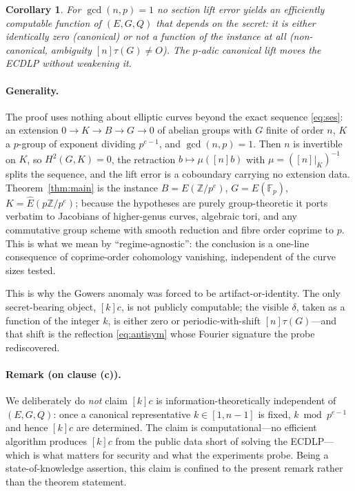 \documentclass[11pt]{article}
\newtheorem{corollary}{Corollary}
\theoremstyle{definition}
\newcommand{\Fp}{\mathbb{F}_p}
\newcommand{\Z}{\mathbb{Z}}
\newcommand{\Ehat}{\widehat{E}}
\begin{document}
\begin{corollary}\label{cor:main}
For $\gcd(n,p)=1$ no section lift error yields an efficiently computable
function of $(E,G,Q)$ that depends on the secret: it is either
identically zero (canonical) or not a function of the instance at all
(non-canonical, ambiguity $[n]\tau(G)\neq O$). The $p$-adic canonical
lift moves the ECDLP without weakening it.
\end{corollary}

\paragraph{Generality.} The proof uses nothing about elliptic curves
beyond the exact sequence \eqref{eq:ses}: an extension
$0\to K\to B\to G\to0$ of abelian groups with $G$ finite of order $n$, $K$
a $p$-group of exponent dividing $p^{e-1}$, and $\gcd(n,p)=1$. Then $n$ is
invertible on $K$, so $H^2(G,K)=0$, the retraction $b\mapsto\mu([n]b)$
with $\mu=([n]|_K)^{-1}$ splits the sequence, and the lift error is a
coboundary carrying no extension data. Theorem~\ref{thm:main} is the
instance $B=E(\Z/p^e)$, $G=E(\Fp)$, $K=\Ehat(p\Z/p^e)$; because the
hypotheses are purely group-theoretic it ports verbatim to Jacobians of
higher-genus curves, algebraic tori, and any commutative group scheme with
smooth reduction and fibre order coprime to $p$. This is what we mean by
``regime-agnostic'': the conclusion is a one-line consequence of
coprime-order cohomology vanishing, independent of the curve sizes tested.

This is why the Gowers anomaly was forced to be artifact-or-identity. The
only secret-bearing object, $[k]c$, is not publicly computable; the
visible $\delta$, taken as a function of the integer $k$, is either zero
or periodic-with-shift $[n]\tau(G)$---and that shift is the reflection
\eqref{eq:antisym} whose Fourier signature the probe rediscovered.

\paragraph{Remark (on clause (c)).} We deliberately do \emph{not} claim
$[k]c$ is information-theoretically independent of $(E,G,Q)$: once a
canonical representative $k\in[1,n-1]$ is fixed, $k\bmod p^{e-1}$ and
hence $[k]c$ are determined. The claim is computational---no efficient
algorithm produces $[k]c$ from the public data short of solving the
ECDLP---which is what matters for security and what the experiments
probe. Being a state-of-knowledge assertion, this claim is confined to
the present remark rather than the theorem statement.
\end{document}
